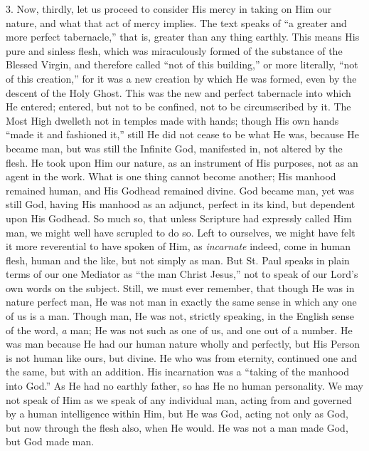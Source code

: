 3. Now, thirdly, let us proceed to consider His mercy in taking on
Him our nature, and what that act of mercy implies. The text speaks of
``a greater and more perfect tabernacle,'' that is, greater than
any thing earthly. This means His pure and sinless flesh, which was
miraculously formed of the substance of the Blessed Virgin, and
therefore called ``not of this building,'' or more literally,
``not of this creation,'' for it was a new creation by which He
was formed, even by the descent of the Holy Ghost. This was the new and
perfect tabernacle into which He entered; entered, but not to be
confined, not to be circumscribed by it. The Most High dwelleth not in
temples made with hands; though His own hands ``made it and
fashioned it,'' still He did not cease to be what He was, because He
became man, but was still the Infinite God, manifested in, not altered
by the flesh. He took upon Him our nature, as an instrument of His
purposes, not as an agent in the work. What is one thing cannot become
another; His manhood remained human, and His Godhead remained divine.
God became man, yet was still God, having His manhood as an adjunct,
perfect in its kind, but dependent upon His Godhead. So much so, that
unless Scripture had expressly called Him man, we might well have
scrupled to do so. Left to ourselves, we might have felt it more
reverential to have spoken of Him, as \emph{incarnate} indeed, come in
human flesh, human and the like, but not simply as man. But St. Paul
speaks in plain terms of our one Mediator as ``the man Christ
Jesus,'' not to speak of our Lord's own words on the subject. Still,
we must ever remember, that though He was in nature perfect man, He was
not man in exactly the same sense in which any one of us is a man.
Though man, He was not, strictly speaking, in the English sense of the
word, \emph{a} man; He was not such as one of us, and one out of a
number. He was man because He had our human nature wholly and perfectly,
but His Person is not human like ours, but divine. He who was from
eternity, continued one and the same, but with an addition. His
incarnation was a ``taking of the manhood into God.'' As He had
no earthly father, so has He no human personality. We may not speak of
Him as we speak of any individual man, acting from and governed by a
human intelligence within Him, but He was God, acting not only as God,
but now through the flesh also, when He would. He was not a man made
God, but God made man.

